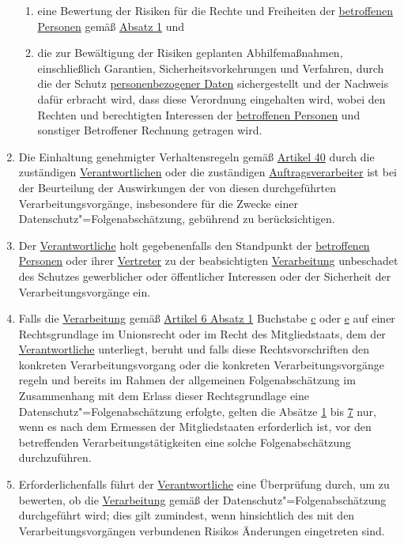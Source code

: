 \begin{enumerate}
\begin{enumerate}
    \item eine Bewertung der Risiken für die Rechte und Freiheiten der \hyperref[itm:04-1]{betroffenen Personen}
     gemäß \hyperref[itm:35-1]{Absatz 1} und%
    \label{itm:35-7c}

    \item die zur Bewältigung der Risiken geplanten Abhilfemaßnahmen, einschließlich Garantien, Sicherheitsvorkehrungen
     und Verfahren, durch die der Schutz \hyperref[itm:04-1]{personenbezogener Daten} sichergestellt und der Nachweis
     dafür erbracht wird, dass diese Verordnung eingehalten wird, wobei den Rechten und berechtigten Interessen
     der \hyperref[itm:04-1]{betroffenen Personen} und sonstiger Betroffener Rechnung getragen wird.%
    \label{itm:35-7d}

  \end{enumerate}

  \item Die Einhaltung genehmigter Verhaltensregeln gemäß \hyperref[ch:40]{Artikel 40} durch die zuständigen
   \hyperref[itm:04-7]{Verantwortlichen} oder die zuständigen \hyperref[itm:04-8]{Auftragsverarbeiter} ist bei der
    Beurteilung der Auswirkungen der von diesen durchgeführten Verarbeitungsvorgänge, insbesondere für die Zwecke einer
    Datenschutz"=Folgenabschätzung, gebührend zu berücksichtigen.%
  \label{itm:35-8}

  \item Der \hyperref[itm:04-7]{Verantwortliche} holt gegebenenfalls den Standpunkt der \hyperref[itm:04-1]
   {betroffenen Personen} oder ihrer \hyperref[itm:04-17]{Vertreter} zu der beabsichtigten \hyperref[itm:04-2]
   {Verarbeitung} unbeschadet des Schutzes gewerblicher oder öffentlicher Interessen oder der Sicherheit der
   Verarbeitungsvorgänge ein.%
  \label{itm:35-9}

  \item Falls die \hyperref[itm:04-2]{Verarbeitung} gemäß \hyperref[itm:06-1]{Artikel 6 Absatz 1} Buchstabe \hyperref
   [itm:06-1c]{c} oder \hyperref[itm:06-1e]{e} auf einer Rechtsgrundlage im Unionsrecht oder im Recht des
   Mitgliedstaats, dem der
   \hyperref[itm:04-7]{Verantwortliche} unterliegt, beruht und falls diese Rechtsvorschriften den konkreten
    Verarbeitungsvorgang oder die konkreten Verarbeitungsvorgänge regeln und bereits im Rahmen der allgemeinen
    Folgenabschätzung im Zusammenhang mit dem Erlass dieser Rechtsgrundlage eine Datenschutz"=Folgenabschätzung
    erfolgte, gelten die Absätze \hyperref[itm:35-1]{1} bis \hyperref[itm:35-7]{7} nur, wenn es nach dem Ermessen der
    Mitgliedstaaten erforderlich ist, vor den betreffenden Verarbeitungstätigkeiten eine solche Folgenabschätzung
    durchzuführen.%
  \label{itm:35-10}

  \item Erforderlichenfalls führt der \hyperref[itm:04-7]{Verantwortliche} eine Überprüfung durch, um zu bewerten, ob
   die \hyperref[itm:04-2]{Verarbeitung} gemäß der Datenschutz"=Folgenabschätzung durchgeführt wird; dies gilt
   zumindest, wenn hinsichtlich des mit den Verarbeitungsvorgängen verbundenen Risikos Änderungen eingetreten sind.%
  \label{itm:35-11}

\end{enumerate}


